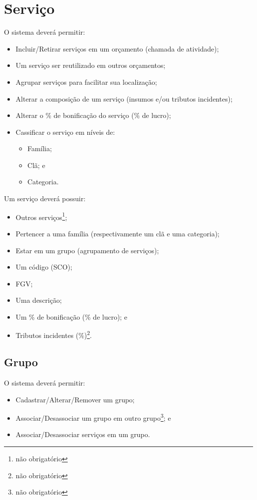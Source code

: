 \chapter{Serviço}

O sistema deverá permitir:

\begin{itemize}
	\item Incluir/Retirar serviços em um orçamento (chamada de atividade);
	\item Um serviço ser reutilizado em outros orçamentos;
	\item Agrupar serviços para facilitar sua localização;
	\item Alterar a composição de um serviço (insumos e/ou tributos incidentes);
	\item Alterar o \% de bonificação do serviço (\% de lucro);
	\item Cassificar o serviço em níveis de:
	\begin{itemize}
		\item Família;
		\item Clã; e
		\item Categoria.
	\end{itemize}
\end{itemize}

Um serviço deverá possuir:

\begin{itemize}
	\item Outros serviços\footnote{não obrigatório};
	\item Pertencer a uma família (respectivamente um clã e uma categoria);
	\item Estar em um grupo (agrupamento de serviços);
	\item Um código (SCO);
	\item FGV;
	\item Uma descrição;
	\item Um \% de bonificação (\% de lucro); e
	\item Tributos incidentes (\%)\footnote{não obrigatório}.
\end{itemize}

\section{Grupo}

O sistema deverá permitir:

\begin{itemize}
	\item Cadastrar/Alterar/Remover um grupo;
	\item Associar/Desassociar um grupo em outro grupo\footnote{não obrigatório}; e
	\item Associar/Desassociar serviços em um grupo.
\end{itemize}

